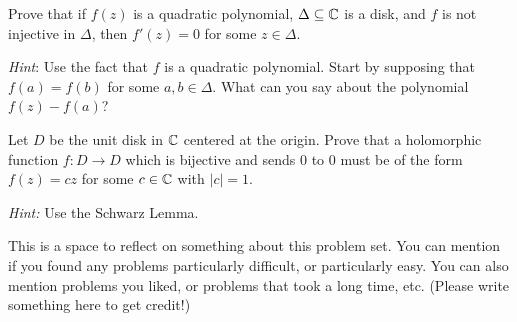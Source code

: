 \begin{problem}
  Prove that if $f(z)$ is a quadratic polynomial, $\Delta\subseteq\mathbb{C}$ is a disk, and $f$ is not injective in $\Delta$, then $f'(z)=0$ for some $z\in\Delta$.

  \emph{Hint}: Use the fact that $f$ is a quadratic polynomial. Start by supposing that $f(a)=f(b)$ for some $a,b\in\Delta$. What can you say about the polynomial $f(z)-f(a)$?
\end{problem}

\begin{problem}
  Let $D$ be the unit disk in $\mathbb{C}$ centered at the origin. Prove that a holomorphic function $f\colon D\to D$ which is bijective and sends 0 to 0 must be of the form $f(z)=cz$ for some $c\in\mathbb{C}$ with $|c|=1$.

  \emph{Hint:} Use the Schwarz Lemma.
\end{problem}

\begin{problem}
  This is a space to reflect on something about this problem set. You can mention if you found any problems particularly difficult, or particularly easy. You can also mention problems you liked, or problems that took a long time, etc. (Please write something here to get credit!)
\end{problem}
